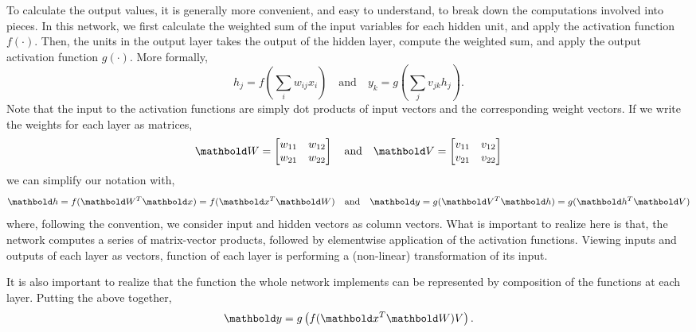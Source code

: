 To calculate the output values,
it is generally more convenient, and easy to understand,
to break down the computations involved into pieces.
In this network,
we first calculate the weighted sum of the input variables
for each hidden unit, and apply the activation function $f(\cdot)$.
Then, the units in the output layer takes the output of the hidden layer,
compute the weighted sum, and apply the output activation function $g(\cdot)$.
More formally,
\begin{equation*}
  h_{j} = f\left(\sum_{i} w_{ij}x_{i}\right)
    \quad\text{and}\quad
  y_{k} = g\left(\sum_{j} v_{jk}h_{j}\right) .
\end{equation*}
Note that the input to the activation functions are simply dot products
of input vectors and the corresponding weight vectors.
If we write the weights for each layer as matrices,
\begin{equation*}
  \vect{W} = \begin{bmatrix}
    w_{11} & w_{12} \\
    w_{21} & w_{22} \\
  \end{bmatrix}
    \quad\text{and}\quad
  \vect{V} = \begin{bmatrix}
    v_{11} & v_{12} \\
    v_{21} & v_{22} \\
  \end{bmatrix}
\end{equation*}
we can simplify our notation with,
\begin{equation*}
  \vect{h} =  f(\vect{W}^{T} \vect{x}) = f(\vect{x}^{T} \vect{W})
    \quad\text{and}\quad
  \vect{y} =  g(\vect{V}^{T} \vect{h}) = g(\vect{h}^{T} \vect{V})
\end{equation*}
where, following the convention,
we consider input and hidden vectors as column vectors.
What is important to realize here is that,
the network computes a series of matrix-vector products,
followed by elementwise application of the activation functions.
Viewing inputs and outputs of each layer as vectors,
function of each layer is performing a (non-linear) transformation
of its input.

It is also important to realize that the function 
the whole network implements can be represented
by composition of the functions at each layer.
Putting the above together,
\begin{equation*}
  \vect{y} = g\left(f(\vect{x}^{T} \vect{W}) V\right) .
\end{equation*}

